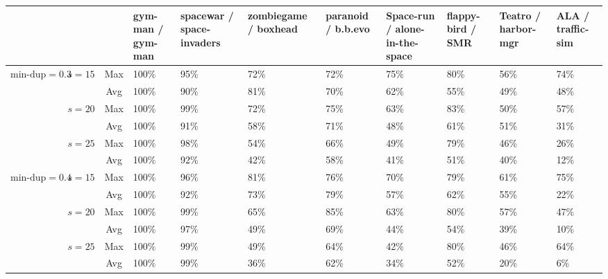 \begin{landscape}
    \begin{table}[h!]
        \centering
        \begin{tabular}{ c|c|c|p{1.5cm}|p{1.5cm}|p{1.5cm}|p{1.5cm}|p{1.5cm}|p{1.5cm}|p{1.5cm}|p{1.5cm} }
            \multicolumn{3}{c|}{} & gym-man / gym-man & spacewar / space-invaders & zombiegame / boxhead & paranoid / b.b.evo & Space-run / alone-in-the-space & flappy-bird / SMR & Teatro / harbor-mgr & ALA / traffic-sim \\ [0.5ex]
            \hline\hline
            \multirow{6}{*}{$\text{min-dup}=0.3$} & \multirow{2}{*}{$s=15$} & Max & 100\% & 95\% & 72\% & 72\% & 75\% & 80\% & 56\% & 74\% \\
            & & Avg & 100\% & 90\% & 81\% & 70\% & 62\% & 55\% & 49\% & 48\% \\
            & \multirow{2}{*}{$s=20$} & Max & 100\% & 99\% & 72\% & 75\% & 63\% & 83\% & 50\% & 57\% \\
            & & Avg & 100\% & 91\% & 58\% & 71\% & 48\% & 61\% & 51\% & 31\% \\
            & \multirow{2}{*}{$s=25$} & Max & 100\% & 98\% & 54\% & 66\% & 49\% & 79\% & 46\% & 26\% \\
            & & Avg & 100\% & 92\% & 42\% & 58\% & 41\% & 51\% & 40\% & 12\% \\
            \hline

            \multirow{6}{*}{$\text{min-dup}=0.4$} & \multirow{2}{*}{$s=15$} & Max & 100\% & 96\% & 81\% & 76\% & 70\% & 79\% & 61\% & 75\% \\
            & & Avg & 100\% & 92\% & 73\% & 79\% & 57\% & 62\% & 55\% & 22\% \\
            & \multirow{2}{*}{$s=20$} & Max & 100\% & 99\% & 65\% & 85\% & 63\% & 80\% & 57\% & 47\% \\
            & & Avg & 100\% & 97\% & 49\% & 69\% & 44\% & 54\% & 39\% & 10\% \\
            & \multirow{2}{*}{$s=25$} & Max & 100\% & 99\% & 49\% & 64\% & 42\% & 80\% & 46\% & 64\% \\
            & & Avg & 100\% & 99\% & 36\% & 62\% & 34\% & 52\% & 20\% & 6\% \\
            \hline


\end{tabular}
\end{table}
\end{landscape}
